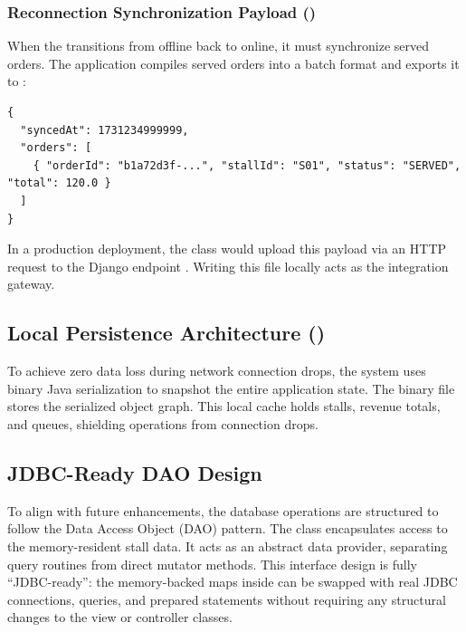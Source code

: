 \subsubsection{Reconnection Synchronization Payload ()}
When the  transitions from offline back to online, it must synchronize served orders. The application compiles served orders into a batch format and exports it to :
\begin{lstlisting}
{
  "syncedAt": 1731234999999,
  "orders": [
    { "orderId": "b1a72d3f-...", "stallId": "S01", "status": "SERVED", "total": 120.0 }
  ]
}
\end{lstlisting}
In a production deployment, the  class would upload this payload via an HTTP  request to the Django endpoint . Writing this file locally acts as the integration gateway.

\subsection{Local Persistence Architecture ()}
To achieve zero data loss during network connection drops, the system uses binary Java serialization to snapshot the entire application state. The  binary file stores the serialized  object graph. This local cache holds stalls, revenue totals, and queues, shielding operations from connection drops.

\subsection{JDBC-Ready DAO Design}
To align with future enhancements, the database operations are structured to follow the Data Access Object (DAO) pattern. 
The  class encapsulates access to the memory-resident stall data. It acts as an abstract data provider, separating query routines from direct mutator methods. 
This interface design is fully ``JDBC-ready'': the memory-backed maps inside  can be swapped with real JDBC connections, queries, and prepared statements without requiring any structural changes to the view or controller classes.

